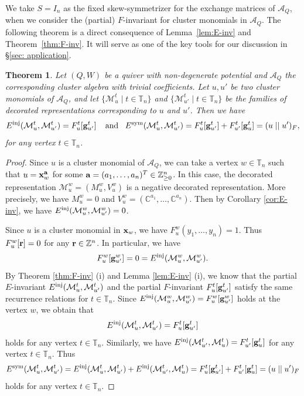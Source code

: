 \documentclass[12pt]{amsart}
\newtheorem{theorem}{Theorem}[section]
\theoremstyle{definition}
\theoremstyle{remark}
\numberwithin{equation}{section}
\begin{document}
We take $S=I_n$ as the fixed skew-symmetrizer for the exchange matrices of $\mathcal A_Q$, when we consider the (partial) $F$-invariant for cluster monomials in $\mathcal A_Q$.
    The following theorem is a direct consequence of Lemma~\ref{lem:E-inv} and  Theorem~\ref{thm:F-inv}. It will serve as one of the key tools for our discussion in \S \ref{sec: application}.
 \begin{theorem}
 \label{thm:F-E-inv}
Let $(Q,W)$ be a quiver with non-degenerate potential and $\mathcal A_Q$ the corresponding cluster algebra with trivial coefficients. 
Let $u, u'$ be two cluster monomials of $\mathcal A_Q$, and let  $\{\mathcal M_u^t\mid t\in\mathbb T_n\}$ and $\{\mathcal M_{u'}^t\mid t\in\mathbb T_n\}$ be the families of decorated representations corresponding to $u$ and $u'$. Then we have
\[E^{\rm inj}(\mathcal M_u^t,\mathcal M_{u'}^t)=F_u^t[{\bf g}_{u'}^t]\;\;\;\;\text{and}\;\;\;E^{\rm sym}(\mathcal M_u^t,\mathcal M_{u'}^t)=F_u^t[{\bf g}_{u'}^t]+F_{u'}^t[{\bf g}_{u}^t]=(u\mid\mid u')_F,
\]
for any vertex $t\in\mathbb T_n$.
\end{theorem}
\begin{proof}






Since $u$ is a cluster monomial of $\mathcal A_Q$, we can take a vertex $w\in\mathbb T_n$ such that $u={\bf x}_w^{\bf a}$ for some ${\bf a}=(a_1,\ldots,a_n)^T\in\mathbb Z_{\geq 0}^n$.
 In this case, the decorated representation $\mathcal M_u^w=(M_u^w,V_u^w)$ is a negative decorated representation. More precisely, we have $M_u^w=0$ and $V_u^w=(\mathbb C^{a_1},\ldots, \mathbb C^{a_n})$. Then by Corollary \ref{cor:E-inv}, we have $E^{\rm inj}(\mathcal M_u^w,\mathcal M_{u'}^w)=0$.

Since $u$ is a cluster monomial in ${\bf x}_w$, we have $F_u^w(y_1,\ldots,y_n)=1$. Thus $F_u^w[{\bf r}]=0$ for any ${\bf r}\in\mathbb Z^n$. In particular, we have
\[
F_u^w[{\bf g}_{u'}^w]=0=E^{\rm inj}(\mathcal M_u^w,\mathcal M_{u'}^w).
\]
By Theorem \ref{thm:F-inv} (i)  and Lemma \ref{lem:E-inv} (i), we know that the partial $E$-invariant $E^{\rm inj}(\mathcal M_u^t,\mathcal M_{u'}^t)$ and the partial $F$-invariant $F_u^t[{\bf g}_{u'}^t]$ satisfy the same recurrence relations for $t\in\mathbb T_n$.
Since $E^{\rm inj}(\mathcal M_u^w,\mathcal M_{u'}^w)=F_u^w[{\bf g}_{u'}^w]$ holds at the vertex $w$, we obtain that 
\begin{eqnarray}\label{eqn:e-inj=f-inv}
    E^{\rm inj}(\mathcal M_u^t,\mathcal M_{u'}^t)=F_u^t[{\bf g}_{u'}^t]
\end{eqnarray}
holds for any vertex $t\in\mathbb T_n$.
Similarly, we have $E^{\rm inj}(\mathcal M_{u'}^t,\mathcal M_{u}^t)=F_{u'}^t[{\bf g}_{u}^t]$ for any vertex $t\in\mathbb T_n$. Thus
 \[ 
E^{\rm sym}(\mathcal M_u^t,\mathcal M_{u'}^t)= E^{\rm inj}(\mathcal M_u^t,\mathcal M_{u'}^t)+ E^{\rm inj}(\mathcal M_{u'}^t,\mathcal M_{u}^t) =F_u^t[{\bf g}_{u'}^t]+F_{u'}^t[{\bf g}_{u}^t]=(u\mid\mid u')_F
 \]
holds for any vertex $t\in\mathbb T_n$.
\end{proof}
\end{document}
